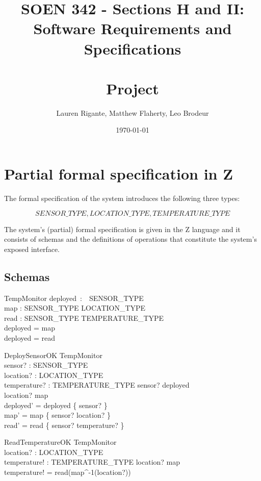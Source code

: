 \documentclass[12pt]{article}
\title{SOEN 342 - Sections H and II:\\Software Requirements and Specifications\\
	\ \\
	Project}
\author{Lauren Rigante, Matthew Flaherty, Leo Brodeur}
\date{\today}
\begin{document}
		\maketitle
		
		\newpage

		\section{Partial formal specification in Z}
		
		The formal specification of the system introduces the following three types:
		
		\[ SENSOR\_TYPE, LOCATION\_TYPE, TEMPERATURE\_TYPE  \]
		
		\noindent The system's (partial) formal specification is given in the Z language and it consists of schemas and the definitions of operations that constitute the system's exposed interface.
		
	
		\subsection{Schemas}
		
		
		\begin{schema}{TempMonitor}
			deployed~:~~SENSOR\_TYPE\\
			map : SENSOR\_TYPE \nrightarrow LOCATION\_TYPE\\
			read : SENSOR\_TYPE  \nrightarrow TEMPERATURE\_TYPE\\
			\where
			deployed = \dom map\\
			deployed = \dom read
		\end{schema}
		
		
		
		\begin{schema}{DeploySensorOK}
			\Delta TempMonitor\\
			sensor? : SENSOR\_TYPE\\
			location? : LOCATION\_TYPE\\
			temperature? : TEMPERATURE\_TYPE
			\where
			sensor? \notin deployed\\
			location? \notin \ran map\\
			deployed' = deployed \cup \{ sensor? \}\\
			map' = map \cup \{ sensor? \mapsto location? \}\\
			read' = read \cup \{ sensor? \mapsto temperature? \}
		\end{schema}
		
		
		\begin{schema}{ReadTemperatureOK}
			\Xi TempMonitor\\
			location? : LOCATION\_TYPE\\
			temperature! : TEMPERATURE\_TYPE
			\where
			location? \in \ran map\\
			temperature! = read(map^{-1}(location?))\\
		\end{schema}
		
\end{document}
